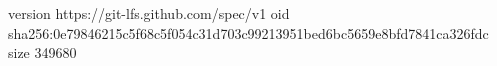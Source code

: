 version https://git-lfs.github.com/spec/v1
oid sha256:0e79846215c5f68c5f054c31d703c99213951bed6bc5659e8bfd7841ca326fdc
size 349680
